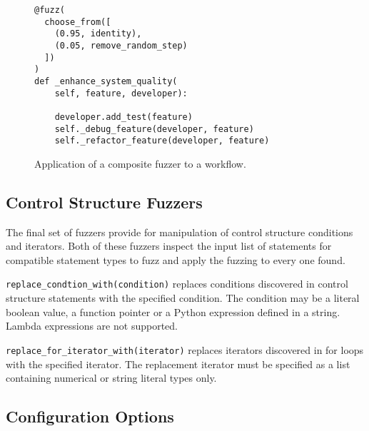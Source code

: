\documentclass{sig-alternate}
\newenvironment{FunctionList}{%
\lstset{basicstyle=\ttfamily\bfseries\small}
\begin{list}{}{\leftmargin=5pt}
}{\end{list}\lstset{basicstyle=\ttfamily\small}}
\begin{document}
\begin{figure}
  \centering

\begin{lstlisting}
@fuzz(
  choose_from([
    (0.95, identity),
    (0.05, remove_random_step)
  ])
)
def _enhance_system_quality(
    self, feature, developer):

    developer.add_test(feature)
    self._debug_feature(developer, feature)
    self._refactor_feature(developer, feature) 
\end{lstlisting}
  
  \caption{Application of a composite fuzzer to a workflow.}
  \label{fig:composite}
\end{figure}


\subsection{Control Structure Fuzzers}


The final set of fuzzers provide for manipulation of control structure
conditions and iterators.  Both of these fuzzers inspect the input list of
statements for compatible statement types to fuzz and apply the fuzzing to every
one found.

\begin{FunctionList}

\item \lstinline!replace_condtion_with(condition)! replaces conditions
  discovered in control structure statements with the specified condition.  The
  condition may be a literal boolean value, a function pointer or a Python
  expression defined in a string.  Lambda expressions are not supported.

\item \lstinline!replace_for_iterator_with(iterator)! replaces iterators
  discovered in for loops with the specified iterator.  The replacement iterator
  must be specified as a list containing numerical or string literal types only.

\end{FunctionList}


\subsection{Configuration Options}
\end{document}
